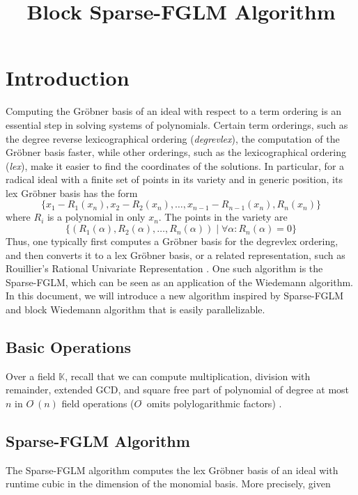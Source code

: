 \documentclass[12pt]{article}
\title{Block Sparse-FGLM Algorithm}
\begin{document}
\tableofcontents
\pagebreak

\section{Introduction}
Computing the Gr\"obner basis of an ideal with respect to a term
ordering is an essential step in solving systems of polynomials. 
Certain term orderings, such as the degree reverse lexicographical 
ordering (\textit{degrevlex}), the computation of the Gr\"obner basis
faster, while other orderings, such as the lexicographical ordering
(\textit{lex}), make it easier to find the coordinates of the solutions.
In particular, for a radical ideal with a finite set of points in its variety
and in generic position, its lex Gr\"obner basis has the form
$$ \{  x_1 - R_1(x_n), x_2-R_2(x_n),\dots, x_{n-1}-R_{n-1}(x_n), R_n(x_n)  \}$$
where $R_i$ is a polynomial in only $x_n$. The points in the variety are
$$\{ ( R_1(\alpha), R_2(\alpha), \dots, R_n(\alpha)  ) \mid \forall \alpha: R_n(\alpha)=0  \}$$
Thus, one typically first computes a Gr\"obner basis for the degrevlex ordering,
and then converts it to a lex Gr\"obner basis, or a related representation, such as 
Rouillier's Rational Univariate Representation \cite{Rouillier99}. One such algorithm is
the Sparse-FGLM, which can be seen as an application
of the Wiedemann algorithm. In this document, we will
introduce a new algorithm inspired by Sparse-FGLM
and block Wiedemann algorithm that is easily
parallelizable.

\subsection{Basic Operations}
Over a field $\mathbb{K}$,
recall that we can compute multiplication,
division with remainder, extended GCD, and square free part
of polynomial of degree at most $n$ in $O^{\tilde{~}}(n)$
field operations ($O^{\tilde{~}}$ omits polylogarithmic factors)
\cite{GaGe13}. 

\subsection{Sparse-FGLM Algorithm}
The Sparse-FGLM algorithm \cite{FaMo17} computes the lex
Gr\"obner basis of an ideal with runtime cubic in the dimension
of the monomial basis. More precisely, given
\end{document}

